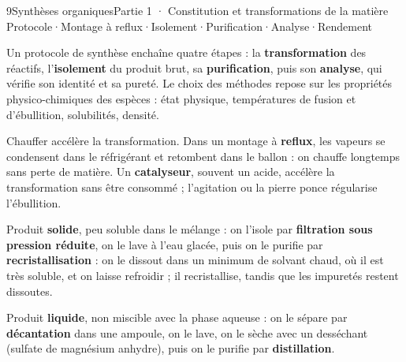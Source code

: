 \begin{ouverture}[synthese]{9}{Synthèses organiques}{Partie 1 · Constitution et transformations de la matière}
{Protocole\enspace·\enspace Montage à reflux\enspace·\enspace Isolement\enspace·\enspace Purification\enspace·\enspace Analyse\enspace·\enspace Rendement}
\end{ouverture}
\essentiel
{}
\begin{definition}
Un protocole de synthèse enchaîne quatre étapes : la \textbf{transformation} des réactifs, l'\textbf{isolement} du produit brut,
sa \textbf{purification}, puis son \textbf{analyse}, qui vérifie son identité et sa pureté. Le choix des méthodes repose sur les
propriétés physico-chimiques des espèces : état physique, températures de fusion et d'ébullition, solubilités, densité.
\end{definition}
\begin{propriete}
Chauffer accélère la transformation. Dans un montage à \textbf{reflux}, les vapeurs se condensent dans le réfrigérant et
retombent dans le ballon : on chauffe longtemps sans perte de matière. Un \textbf{catalyseur}, souvent un acide, accélère la
transformation sans être consommé ; l'agitation ou la pierre ponce régularise l'ébullition.
\end{propriete}
\begin{savoirfaire}
\begin{questions}
\item Produit \textbf{solide}, peu soluble dans le mélange : on l'isole par \textbf{filtration sous pression réduite}, on le lave à
l'eau glacée, puis on le purifie par \textbf{recristallisation} : on le dissout dans un minimum de solvant chaud, où il est très
soluble, et on laisse refroidir ; il recristallise, tandis que les impuretés restent dissoutes.
\item Produit \textbf{liquide}, non miscible avec la phase aqueuse : on le sépare par \textbf{décantation} dans une ampoule, on le lave,
on le sèche avec un desséchant (sulfate de magnésium anhydre), puis on le purifie par \textbf{distillation}.
\end{questions}
\end{savoirfaire}

